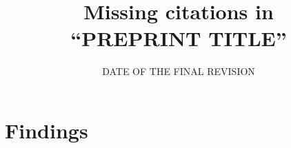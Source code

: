 \documentclass[11pt]{article}
\title{Missing citations in\\ ``{PREPRINT TITLE}''}
\date{{DATE OF THE FINAL REVISION}}
\begin{document}
\maketitle



\tableofcontents




\section{Findings}\label{sec:findings}



\end{document}
